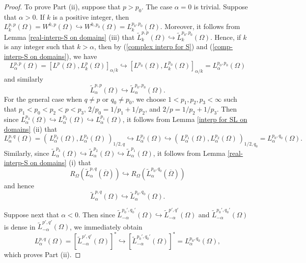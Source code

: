 \documentclass[10pt,a4paper]{amsart}
\begin{document}
\begin{proof}
To prove Part (ii), suppose that $p>p_0$.  The case $\alpha =0$ is trivial. Suppose that $\alpha >0$. If $k$ is a positive  integer, then $L_k^{p,p}(\Omega ) =W^{k,p}(\Omega )  \hookrightarrow  W^{k,p_0}(\Omega )= L_k^{p_0 ,p_0}(\Omega )$.
Moreover, it follows from Lemma \ref{real-interp-S on domains} (iii) that $\widetilde{L}_k^{p,p}(\Omega ) \hookrightarrow \widetilde{L}_k^{p_0 ,p_0}(\Omega )$.
Hence, if $k $ is any integer such that   $k >  \alpha $, then by   (\ref{complex interp for S}) and (\ref{comp-interp-S on domains}), we   have
$$
 L_\alpha^{p,p} (\Omega )  = \left[ L^p (\Omega ), L_k^{p}(\Omega )\right]_{\alpha /k} \hookrightarrow \left[ L^{p_0} (\Omega ), L_k^{p_0}(\Omega )\right]_{\alpha /k}=L_\alpha^{p_0 , p_0} (\Omega )
$$
and similarly
$$
\widetilde{L}_\alpha^{p,p}(\Omega ) \hookrightarrow \widetilde{L}_\alpha^{p_0 ,p_0}(\Omega ).
$$
For the general case when $q \neq p$ or $q_0 \neq p_0$, we choose $1<p_1 , p_2 , p_3 <\infty$ such that  $p_1 < p_0 < p_2 < p <p_3$, $2/p_0 =1/p_1 +1/p_2$, and $2/p =1/p_2 +1/p_3$.
Then since $L_\alpha^{p_3}(\Omega )  \hookrightarrow  L_\alpha^{p_2}(\Omega )\hookrightarrow  L_\alpha^{p_1}(\Omega )$, it follows from  Lemma \ref{interp for SL on domains} (ii) that
\[
L_\alpha^{p,q}(\Omega ) = \left(\,  L_\alpha^{p_2}(\Omega ) , L_\alpha^{p_3}(\Omega ) \, \right)_{1/2,q}  \hookrightarrow  L_\alpha^{p_2}(\Omega ) \hookrightarrow   \left(\,  L_\alpha^{p_1}(\Omega ) , L_\alpha^{p_2}(\Omega ) \, \right)_{1/2,q_0} = L_\alpha^{p_0 ,q_0 }(\Omega ).
\]
Similarly, since $\widetilde{L}_\alpha^{p_3}(\Omega )  \hookrightarrow  \widetilde{L}_\alpha^{p_2}(\Omega )\hookrightarrow  \widetilde{L}_\alpha^{p_1}(\Omega )$, it follows from  Lemma \ref{real-interp-S on domains} (i) that
\[
R_\Omega  (\widetilde{L}_\alpha^{p,q} (\overline{\Omega} ) ) \hookrightarrow  R_\Omega  (\widetilde{L}_\alpha^{p_0 ,q_0} (\overline{\Omega} ) )
\]
and hence
\[
\widetilde{L}_\alpha^{p,q}(\Omega )   \hookrightarrow \widetilde{L}_\alpha^{p_0 ,q_0 }(\Omega ).
\]

Suppose next that  $\alpha < 0$. Then since $\widetilde{L}_{-\alpha}^{p_0 ',q_0 '}(\Omega )   \hookrightarrow \widetilde{L}_{-\alpha}^{p' ,q ' }(\Omega )$ and $\widetilde{L}_{-\alpha}^{p_0 ',q_0 '}(\Omega ) $ is dense in $ \widetilde{L}_{-\alpha}^{p' ,q ' }(\Omega )$, we immediately obtain
\[
L_\alpha^{p,q}(\Omega )  = \left[ \widetilde{L}_{-\alpha}^{p',q'}(\Omega ) \right]^* \hookrightarrow \left[ \widetilde{L}_{-\alpha}^{p_0 ',q_0 '}(\Omega ) \right]^* = L_{\alpha}^{p_0 ,q_0 }(\Omega )  ,
\]
which proves Part (ii).


\end{proof}
\end{document}
